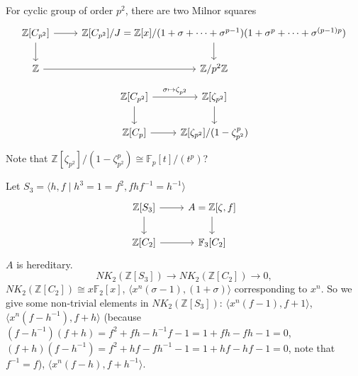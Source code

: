 For cyclic group of order $p^2$, there are two Milnor squares
	\[\begin{tikzcd}
		\mathbb{Z}[C_{p^2}] \ar[r] \ar[d]& \mathbb{Z}[C_{p^2}]/J=\mathbb{Z}[x]/(1+\sigma+\cdots+\sigma^{p-1})(1+\sigma^p+\cdots+\sigma^{(p-1)p})\ar[d]\\
		 \mathbb{Z}\ar[r] & \mathbb{Z}/p^2\mathbb{Z}
	\end{tikzcd}\]
	\[\begin{tikzcd}
			\mathbb{Z}[C_{p^2}] \ar[r,"\sigma \mapsto \zeta_{p^2}"] \ar[d]& \mathbb{Z}[\zeta_{p^2}]\ar[d]\\
			\mathbb{Z}[C_p] \ar[r] & \mathbb{Z}[\zeta_{p^2}]/(1-\zeta_{p^2}^p)
		\end{tikzcd}\]
Note that $\mathbb{Z}[\zeta_{p^2}]/(1-\zeta_{p^2}^p)\cong \mathbb{F}_p[t]/(t^p)$?

Let $S_3=\langle h,f\mid h^3=1=f^2, fhf^{-1}=h^{-1} \rangle$
\[\begin{tikzcd}
		\mathbb{Z}[S_3] \ar[r] \ar[d]& A=\mathbb{Z}[\zeta,f]\ar[d]\\
		 \mathbb{Z}[C_2]\ar[r] & \mathbb{F}_3[C_2]
	\end{tikzcd}\]
$A$ is hereditary.
\[NK_2(\mathbb{Z}[S_3])\longrightarrow NK_2(\mathbb{Z}[C_2])\longrightarrow 0,\]
$NK_2(\mathbb{Z}[C_2])\cong x \mathbb{F}_2[x]$, $\langle x^n(\sigma-1),(1+\sigma)\rangle$ corresponding to $x^n$. So we give some non-trivial elements in $NK_2(\mathbb{Z}[S_3])$:
$\langle x^n(f-1),f+1\rangle$, $\langle x^n(f-h^{-1}),f+h\rangle$ (because $(f-h^{-1})(f+h)=f^2+fh-h^{-1}f-1=1+fh-fh-1=0$, $(f+h)(f-h^{-1})=f^2+hf-fh^{-1}-1=1+hf-hf-1=0$, note that $f^{-1}=f$), $\langle x^n(f-h),f+h^{-1}\rangle$.

















